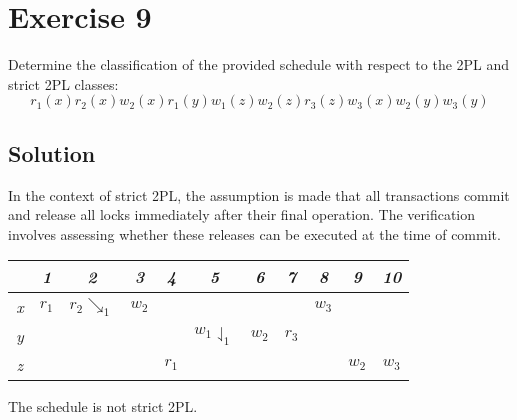 \section{Exercise 9}

Determine the classification of the provided schedule with respect to the 2PL and strict 2PL classes:
\[r_1(x) r_2(x) w_2(x) r_1(y) w_1(z) w_2(z) r_3(z) w_3(x) w_2(y) w_3(y)\]

\subsection*{Solution}
In the context of strict 2PL, the assumption is made that all transactions commit and release all locks immediately after their final operation. 
The verification involves assessing whether these releases can be executed at the time of commit.
\begin{table}[H]
    \centering
    \begin{tabular}{c|cccccccccc}
            & \textit{1} & \textit{2} & \textit{3} & \textit{4} & \textit{5} & \textit{6} & \textit{7} & \textit{8} & \textit{9} & \textit{10} \\ \hline
    \textit{x} & $r_1$      & $r_2\searrow _1$          & $w_2$      &            &            &            &            & $w_3$      &            &             \\
    \textit{y} &            &                           &            &            & $w_1\downharpoonleft_1$      & $w_2$      & $r_3$      &            &            &             \\
    \textit{z} &            &                           &            & $r_1$      &            &            &            &            & $w_2$      & $w_3$      
    \end{tabular}%
\end{table}
The schedule is not strict 2PL.

